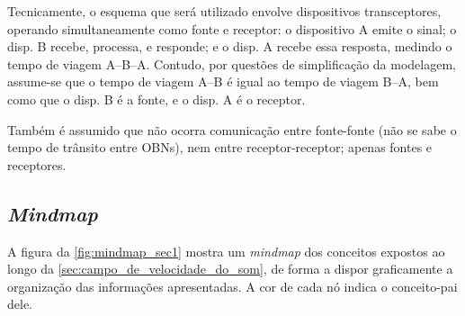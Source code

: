 Tecnicamente, o esquema que será utilizado envolve dispositivos transceptores, operando simultaneamente como fonte e receptor: o dispositivo A emite o sinal; o disp. B recebe, processa, e responde; e o disp. A recebe essa resposta, medindo o tempo de viagem A--B--A. Contudo, por questões de simplificação da modelagem, assume-se que o tempo de viagem A--B é igual ao tempo de viagem B--A, bem como que o disp. B é a fonte, e o disp. A é o receptor.

Também é assumido que não ocorra comunicação entre fonte-fonte (não se sabe o tempo de trânsito entre OBNs), nem entre receptor-receptor; apenas fontes e receptores.

\subsection{\textsl{Mindmap}}

A figura da \cref{fig:mindmap_sec1} mostra um \textsl{mindmap} dos conceitos expostos ao longo da \cref{sec:campo_de_velocidade_do_som}, de forma a dispor graficamente a organização das informações apresentadas. A cor de cada nó indica o conceito-pai dele.


